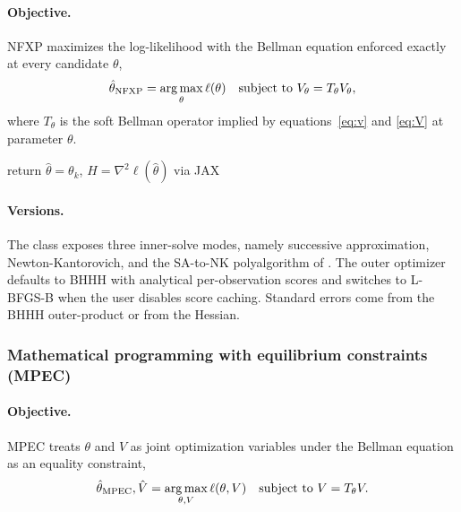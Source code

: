 \paragraph{Objective.} NFXP \citep{rust1987} maximizes the log-likelihood with the Bellman equation enforced exactly at every candidate $\theta$,
\begin{equation}
\hat\theta_{\mathrm{NFXP}} = \operatorname*{arg\,max}_{\theta} \ell(\theta) \quad \text{subject to } V_\theta = T_\theta V_\theta,
\label{eq:nfxp}
\end{equation}
where $T_\theta$ is the soft Bellman operator implied by equations~\eqref{eq:v} and \eqref{eq:V} at parameter $\theta$.

\begin{algorithm}[H]
\SetAlgoLined
{}
return $\hat\theta = \theta_k$, $H = \nabla^2 \ell(\hat\theta)$ via JAX\;
\caption{NFXP polyalgorithm}
\end{algorithm}

\paragraph{Versions.} The  class exposes three inner-solve modes, namely successive approximation, Newton-Kantorovich, and the SA-to-NK polyalgorithm of \citet{iskhakov2016}. The outer optimizer defaults to BHHH with analytical per-observation scores and switches to L-BFGS-B when the user disables score caching. Standard errors come from the BHHH outer-product or from the Hessian.

\subsubsection{Mathematical programming with equilibrium constraints (MPEC)}

\paragraph{Objective.} MPEC \citep{su2012} treats $\theta$ and $V$ as joint optimization variables under the Bellman equation as an equality constraint,
\begin{equation}
\hat\theta_{\mathrm{MPEC}}, \hat V = \operatorname*{arg\,max}_{\theta, V} \ell(\theta, V) \quad \text{subject to } V = T_\theta V.
\label{eq:mpec}
\end{equation}

